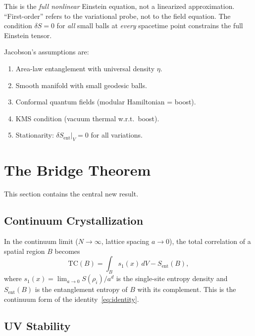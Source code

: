 \documentclass[aps,pra,twocolumn,superscriptaddress,floatfix]{revtex4-2}
\begin{document}
This is the \emph{full nonlinear} Einstein equation, not a linearized approximation.
``First-order'' refers to the variational probe, not to the field equation.
The condition $\delta S = 0$ for \emph{all} small balls at \emph{every} spacetime point constrains the full Einstein tensor.

Jacobson's assumptions are:
\begin{enumerate}
\item[\textbf{A1.}] Area-law entanglement with universal density $\eta$.
\item[\textbf{A2.}] Smooth manifold with small geodesic balls.
\item[\textbf{A3.}] Conformal quantum fields (modular Hamiltonian = boost).
\item[\textbf{A4.}] KMS condition (vacuum thermal w.r.t.\ boost).
\item[\textbf{A5.}] Stationarity: $\delta S_{\mathrm{ent}}|_V = 0$ for all variations.
\end{enumerate}


\section{The Bridge Theorem}
\label{sec:bridge}

This section contains the central new result.

\subsection{Continuum Crystallization}

In the continuum limit ($N \to \infty$, lattice spacing $a \to 0$), the total correlation of a spatial region $B$ becomes
\begin{equation}
\mathrm{TC}(B) = \int_B s_1(x) \, dV - S_{\mathrm{ent}}(B),
\label{eq:tc_continuum}
\end{equation}
where $s_1(x) = \lim_{a \to 0} S(\rho_i) / a^d$ is the single-site entropy density and $S_{\mathrm{ent}}(B)$ is the entanglement entropy of $B$ with its complement.
This is the continuum form of the identity~\eqref{eq:identity}.

\subsection{UV Stability}
\end{document}
